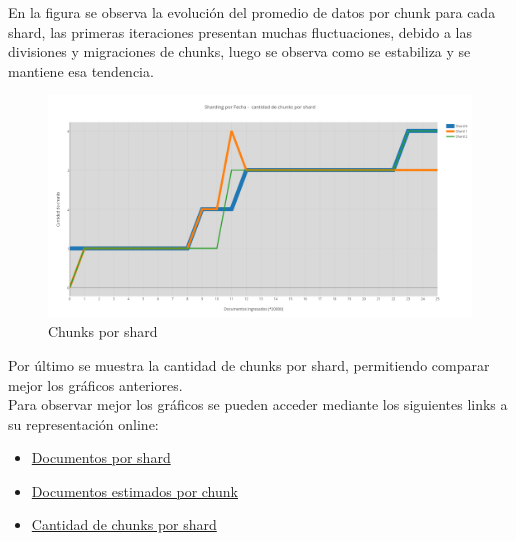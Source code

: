 En la figura se observa la evolución del promedio de datos por chunk para cada shard, las primeras iteraciones presentan muchas fluctuaciones, debido a las divisiones y migraciones
de chunks, luego se observa como se estabiliza y se mantiene esa tendencia.

\begin{figure}[h!]
 \centering
 \includegraphics[scale=0.3,keepaspectratio=true]{./Fecha-cantidad-de-chunks-por-shard.png}
 \caption{Chunks por shard}
\end{figure}

Por último se muestra la cantidad de chunks por shard, permitiendo comparar mejor los gráficos anteriores.\\

Para observar mejor los gráficos se pueden acceder mediante los siguientes links a su representación online:
\begin{itemize}
 \item \href{https://plot.ly/~fzanollo/22/sharding-por-fecha-documentos-por-shard/}{Documentos por shard}
 \item \href{https://plot.ly/~fzanollo/31/sharding-por-fecha-documentos-estimados-por-chunk/}{Documentos estimados por chunk}
 \item \href{https://plot.ly/~fzanollo/47/sharding-por-fecha-cantidad-de-chunks-por-shard/}{Cantidad de chunks por shard}
\end{itemize}